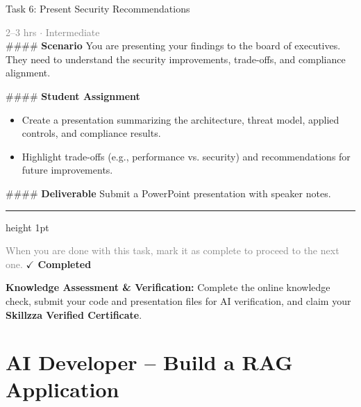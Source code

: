 \documentclass[10pt,a4paper]{article}
\begin{document}
\begin{taskbox}{Task 6: Present Security Recommendations}

    {\small \textcolor{gray}{2--3 hrs $\cdot$ Intermediate}}\\[12pt]

    \#\#\#\# \textbf{Scenario}
You are presenting your findings to the board of executives. They need to understand the security improvements, trade-offs, and compliance alignment.

\#\#\#\# \textbf{Student Assignment}
\begin{itemize}
    \item Create a presentation summarizing the architecture, threat model, applied controls, and compliance results.
    \item Highlight trade-offs (e.g., performance vs. security) and recommendations for future improvements.
\end{itemize}

\#\#\#\# \textbf{Deliverable}
Submit a PowerPoint presentation with speaker notes.\par

    \vspace{16pt}

    \textcolor{cardBorder}{\hrule height 1pt}\vspace{8pt}

    \small \textcolor{gray}{When you are done with this task, mark it as complete to proceed to the next one.} \hfill \textbf{\textcolor{brandDark}{$\checkmark$ Completed}}

\end{taskbox}

\begin{completionbox}
    \textbf{Knowledge Assessment \& Verification:} Complete the online knowledge check, submit your code and presentation files for AI verification, and claim your \textbf{Skillzza Verified Certificate}.
\end{completionbox}

\newpage




\section*{AI Developer – Build a RAG Application}
\end{document}
